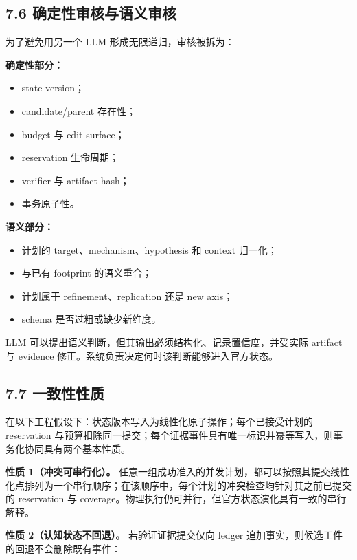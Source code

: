 \documentclass[
  11pt]{ctexart}
\providecommand{\tightlist}{%
  \setlength{\itemsep}{0pt}\setlength{\parskip}{0pt}}
\begin{document}
\subsection{7.6
确定性审核与语义审核}\label{ux786eux5b9aux6027ux5ba1ux6838ux4e0eux8bedux4e49ux5ba1ux6838}

为了避免用另一个 LLM 形成无限递归，审核被拆为：

\textbf{确定性部分：}

\begin{itemize}
\tightlist
\item
  state version；
\item
  candidate/parent 存在性；
\item
  budget 与 edit surface；
\item
  reservation 生命周期；
\item
  verifier 与 artifact hash；
\item
  事务原子性。
\end{itemize}

\textbf{语义部分：}

\begin{itemize}
\tightlist
\item
  计划的 target、mechanism、hypothesis 和 context 归一化；
\item
  与已有 footprint 的语义重合；
\item
  计划属于 refinement、replication 还是 new axis；
\item
  schema 是否过粗或缺少新维度。
\end{itemize}

LLM 可以提出语义判断，但其输出必须结构化、记录置信度，并受实际 artifact
与 evidence 修正。系统负责决定何时该判断能够进入官方状态。

\subsection{7.7 一致性性质}\label{ux4e00ux81f4ux6027ux6027ux8d28}

在以下工程假设下：状态版本写入为线性化原子操作；每个已接受计划的
reservation
与预算扣除同一提交；每个证据事件具有唯一标识并幂等写入，则事务化协同具有两个基本性质。

\textbf{性质 1（冲突可串行化）。}
任意一组成功准入的并发计划，都可以按照其提交线性化点排列为一个串行顺序；在该顺序中，每个计划的冲突检查均针对其之前已提交的
reservation 与
coverage。物理执行仍可并行，但官方状态演化具有一致的串行解释。

\textbf{性质 2（认知状态不回退）。} 若验证证据提交仅向 ledger
追加事实，则候选工件的回退不会删除既有事件：
\end{document}

